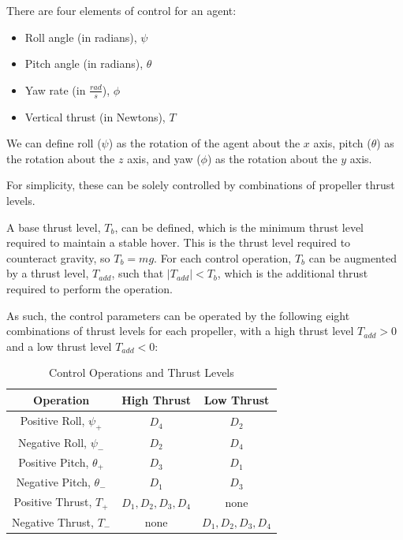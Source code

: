 \documentclass[12pt]{article}
\begin{document}
There are four elements of control for an agent:
\begin{itemize}
    \item Roll angle (in radians), $\psi$
    \item Pitch angle (in radians), $\theta$
    \item Yaw rate (in $\frac{rad}{s}$), $\phi$
    \item Vertical thrust (in Newtons), $T$
\end{itemize}

We can define roll ($\psi$) as the rotation of the agent about the $x$ axis, pitch ($\theta$) as the rotation about the $z$ axis, and yaw ($\phi$) as the rotation about the $y$ axis.

For simplicity, these can be solely controlled by combinations of propeller thrust levels. 

A base thrust level, $T_b$, can be defined, which is the minimum thrust level required to maintain a stable hover. This is the thrust level required to counteract gravity, so $T_b = mg$. For each control operation, $T_b$ can be augmented by a thrust level, $T_{add}$, such that $|T_{add}| < T_b$, which is the additional thrust required to perform the operation.

As such, the control parameters can be operated by the following eight combinations of thrust levels for each propeller, with a high thrust level $T_{add} > 0$ and a low thrust level $T_{add} < 0$:


\begin{table}[H]
    \begin{center}
    \begin{tabular}{| c | c | c |} 
    \hline
    Operation & High Thrust & Low Thrust \\ 
    \hline
    Positive Roll, $\psi_+$ & $D_4$ & $D_2$ \\
    \hline
    Negative Roll, $\psi_-$ & $D_2$ & $D_4$ \\
    \hline
    Positive Pitch, $\theta_+$ & $D_3$ & $D_1$ \\
    \hline
    Negative Pitch, $\theta_-$ & $D_1$ & $D_3$ \\
    \hline
    Positive Thrust, $T_+$ & $D_1, D_2, D_3, D_4$ & none \\
    \hline
    Negative Thrust, $T_-$ & none & $D_1, D_2, D_3, D_4$ \\
    \hline
    \end{tabular}
    \end{center}
    \caption{Control Operations and Thrust Levels}
    \label{tab:control}
\end{table}
\end{document}
